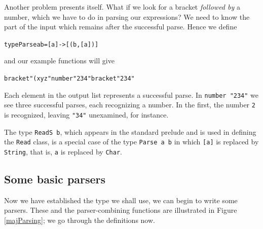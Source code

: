 Another problem presents itself. What if we look for a bracket {\em followed
by\/} a number, which we have to do in parsing our expressions? We need to
know the part of the input which remains after the successful parse. Hence we
define
\begin{alltt}
type Parse a b = [a] -> [(b,[a])]
\end{alltt}
and our example functions will give
\begin{alltt}
bracket "(xyz" \step [('(' , "xyz")]
number  "234"  \step [(2,"34") , (23,"4") , (234,"")]
bracket "234"  \step []
\end{alltt}
Each element in the output list represents a successful parse. In
\texttt{number "234"} we see three successful parses, each recognizing a number.
In the first, the number \texttt{2} is recognized, leaving \texttt{"34"}
unexamined, for instance.

The type \texttt{ReadS b}, which appears in the standard prelude and is used in
defining the \texttt{Read} class, is a special case of the type \texttt{Parse a b} in which
\texttt{[a]} is replaced by \texttt{String}, that is, \texttt{a} is replaced by \texttt{Char}.

\subsection*{Some basic parsers}

Now we have established the type we shall use, we can begin to write some
parsers. These and the parser-combining functions are illustrated in Figure
\ref{majParsing}; we go through the definitions now.

